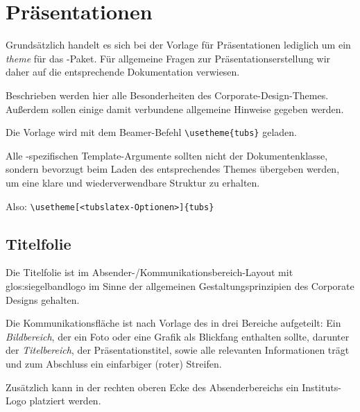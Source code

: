 \chapter{Präsentationen}


Grundsätzlich handelt es sich bei der Vorlage für Präsentationen lediglich um
ein \emph{theme} für das -Paket.
Für allgemeine Fragen zur Präsentationserstellung wir daher auf die
entsprechende Dokumentation\cite{beamer} verwiesen.

Beschrieben werden hier alle Besonderheiten des Corporate-Design-Themes.
Außerdem sollen einige damit verbundene allgemeine Hinweise gegeben werden.

Die Vorlage wird mit dem Beamer-Befehl \lstinline!\usetheme{tubs}! geladen.

\begin{hint}\sloppy
  Alle \tubslatex-spezifischen Template-Argumente sollten nicht der Dokumentenklasse,
  sondern bevorzugt beim Laden des entsprechendes Themes übergeben werden,
  um eine klare und wiederverwendbare Struktur zu erhalten.
  
  Also: \lstinline!\usetheme[<tubslatex-Optionen>]{tubs}!
\end{hint}
  

\section{Titelfolie}\label{sec:titelfolie}

Die Titelfolie ist im Absender-/Kommunikationsbereich-Layout mit
\gls{glos:siegelbandlogo} im Sinne der allgemeinen Gestaltungsprinzipien des
Corporate Designs gehalten.

Die Kommunikationsfläche ist nach Vorlage des 
in drei Bereiche aufgeteilt:
Ein \emph{Bildbereich}, der ein Foto oder eine Grafik als Blickfang enthalten
sollte, darunter der \emph{Titelbereich}, der Präsentationstitel,
sowie alle relevanten Informationen trägt
und zum Abschluss ein einfarbiger (roter) Streifen.

Zusätzlich kann in der rechten oberen Ecke des Absenderbereichs ein
Instituts-Logo platziert werden.

